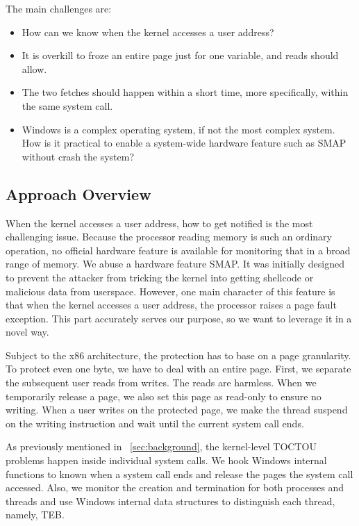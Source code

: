 The main challenges are:

\begin{itemize}
	\item How can we know when the kernel accesses a user address?
	\item It is overkill to froze an entire page just for one variable, and reads should allow.
	\item The two fetches should happen within a short time, more specifically, within the same system call. 
	\item Windows is a complex operating system, if not the most complex system. How is it practical to enable a system-wide hardware feature such as SMAP without crash the system?
\end{itemize}


\subsection{Approach Overview}


When the kernel accesses a user address, how to get notified is the most challenging issue. Because the processor reading memory is such an ordinary operation, no official hardware feature is available for monitoring that in a broad range of memory. We abuse a hardware feature SMAP. It was initially designed to prevent the attacker from tricking the kernel into getting shellcode or malicious data from userspace. However, one main character of this feature is that when the kernel accesses a user address, the processor raises a page fault exception. This part accurately serves our purpose, so we want to leverage it in a novel way.

Subject to the x86 architecture, the protection has to base on a page granularity. To protect even one byte, we have to deal with an entire page.
First, we separate the subsequent user reads from writes. The reads are harmless.  When we temporarily release a page, we also set this page as read-only to ensure no writing. When a user writes on the protected page, we make the thread suspend on the writing instruction and wait until the current system call ends.

As previously mentioned in ~\autoref{sec:background}, the kernel-level TOCTOU problems happen inside individual system calls. We hook Windows internal functions to known when a system call ends and release the pages the system call accessed. Also, we monitor the creation and termination for both processes and threads and use Windows internal data structures to distinguish each thread, namely, TEB.

